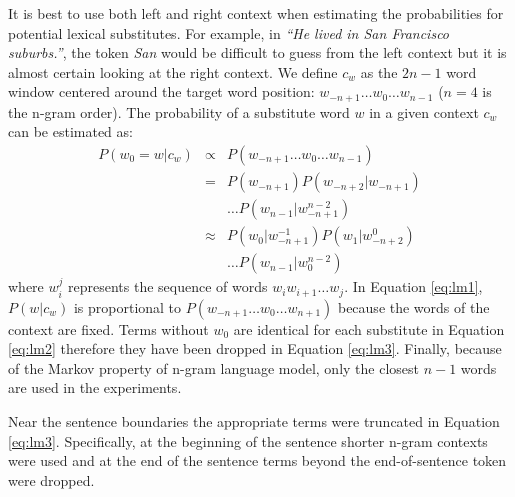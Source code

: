 It is best to use both left and right context when estimating the
probabilities for potential lexical substitutes.  For example, in
\emph{``He lived in San Francisco suburbs.''}, the token \emph{San}
would be difficult to guess from the left context but it is almost
certain looking at the right context.  We define $c_w$ as the $2n-1$
word window centered around the target word position: $w_{-n+1} \ldots
w_0 \ldots w_{n-1}$ ($n=4$ is the n-gram order).  The probability of a
substitute word $w$ in a given context $c_w$ can be estimated as:
\begin{eqnarray}
  \label{eq:lm1}P(w_0 = w | c_w) & \propto & P(w_{-n+1}\ldots w_0\ldots w_{n-1})\\
  \label{eq:lm2}& = & P(w_{-n+1})P(w_{-n+2}|w_{-n+1})\nonumber\\
  &&\ldots P(w_{n-1}|w_{-n+1}^{n-2})\\
  \label{eq:lm3}& \approx & P(w_0| w_{-n+1}^{-1})P(w_{1}|w_{-n+2}^0)\nonumber\\
  &&\ldots P(w_{n-1}|w_0^{n-2})
\end{eqnarray}
where $w_i^j$ represents the sequence of words $w_i w_{i+1} \ldots
w_{j}$.  In Equation \ref{eq:lm1}, $P(w|c_w)$ is proportional to
$P(w_{-n+1}\ldots w_0 \ldots w_{n+1})$ because the words of the
context are fixed.  Terms without $w_0$ are identical for each
substitute in Equation \ref{eq:lm2} therefore they have been dropped
in Equation \ref{eq:lm3}.  Finally, because of the Markov property of
n-gram language model, only the closest $n-1$ words are used in the
experiments.

Near the sentence boundaries the appropriate terms were truncated in
Equation \ref{eq:lm3}.  Specifically, at the beginning of the sentence
shorter n-gram contexts were used and at the end of the sentence terms
beyond the end-of-sentence token were dropped.


